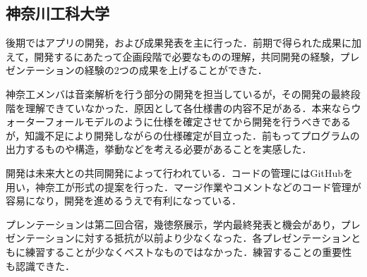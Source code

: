 \subsection{神奈川工科大学}
\par 後期ではアプリの開発，および成果発表を主に行った．前期で得られた成果に加えて，開発するにあたって企画段階で必要なものの理解，共同開発の経験，プレゼンテーションの経験の2つの成果を上げることができた．
\par 神奈工メンバは音楽解析を行う部分の開発を担当しているが，その開発の最終段階を理解できていなかった．原因として各仕様書の内容不足がある．本来ならウォーターフォールモデルのように仕様を確定させてから開発を行うべきであるが，知識不足により開発しながらの仕様確定が目立った．前もってプログラムの出力するものや構造，挙動などを考える必要があることを実感した．
\par 開発は未来大との共同開発によって行われている．コードの管理にはGitHubを用い，神奈工が形式の提案を行った．マージ作業やコメントなどのコード管理が容易になり，開発を進めるうえで有利になっている．
\par プレンテーションは第二回合宿，幾徳祭展示，学内最終発表と機会があり，プレゼンテーションに対する抵抗が以前より少なくなった．各プレゼンテーションともに練習することが少なくベストなものではなかった．練習することの重要性も認識できた．
